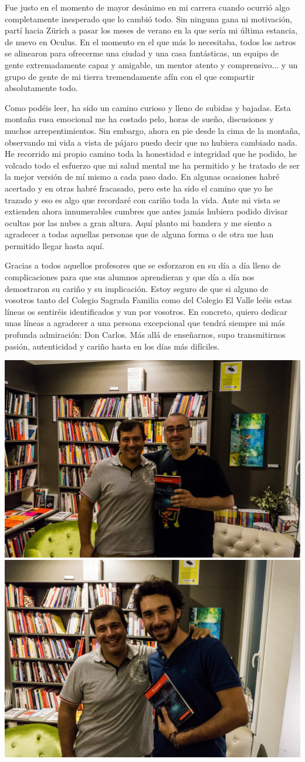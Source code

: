 \newpage

Fue justo en el momento de mayor desánimo en mi carrera cuando ocurrió algo completamente inesperado que lo cambió todo. Sin ninguna gana ni motivación, partí hacia Zürich a pasar los meses de verano en la que sería mi última estancia, de nuevo en Oculus. En el momento en el que más lo necesitaba, todos los astros se alinearon para ofrecerme una ciudad y una casa fantásticas, un equipo de gente extremadamente capaz y amigable, un mentor atento y comprensivo... y un grupo de gente de mi tierra tremendamente afín con el que compartir absolutamente todo.

Como podéis leer, ha sido un camino curioso y lleno de subidas y bajadas. Esta montaña rusa emocional me ha costado pelo, horas de sueño, discusiones y muchos arrepentimientos. Sin embargo, ahora en pie desde la cima de la montaña, observando mi vida a vista de pájaro puedo decir que no hubiera cambiado nada. He recorrido mi propio camino toda la honestidad e integridad que he podido, he volcado todo el esfuerzo que mi salud mental me ha permitido y he tratado de ser la mejor versión de mí mismo a cada paso dado. En algunas ocasiones habré acertado y en otras habré fracasado, pero este ha sido el camino que yo he trazado y eso es algo que recordaré con cariño toda la vida.
Ante mi vista se extienden ahora innumerables cumbres que antes jamás hubiera podido divisar ocultas por las nubes a gran altura. Aquí planto mi bandera y me siento a agradecer a todas aquellas personas que de alguna forma o de otra me han permitido llegar hasta aquí.

Gracias a todos aquellos profesores que se esforzaron en su día a día lleno de complicaciones para que sus alumnos aprendieran y que día a día nos demostraron su cariño y su implicación. Estoy seguro de que si alguno de vosotros tanto del Colegio Sagrada Familia como del Colegio El Valle leéis estas líneas os sentiréis identificados y van por vosotros. En concreto, quiero dedicar unas líneas a agradecer a una persona excepcional que tendrá siempre mi más profunda admiración: Don Carlos. Más allá de enseñarnos, supo transmitirnos pasión, autenticidad y cariño hasta en los días más difíciles.

\begin{center}
\includegraphics[width=0.45\linewidth]{Figures/Ack/valle}
\includegraphics[width=0.45\linewidth]{Figures/Ack/valle2}
\end{center}

